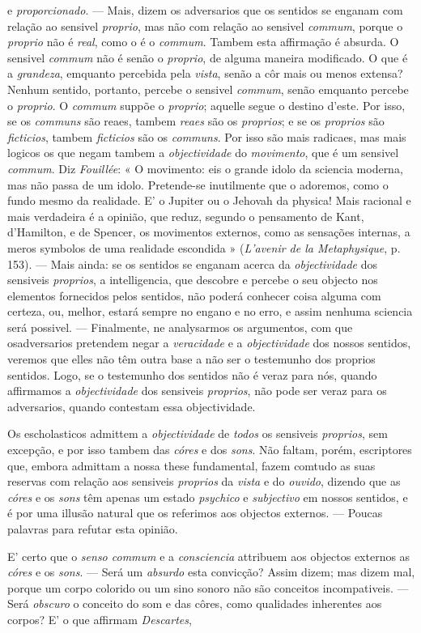 e \emph{proporcionado}. --- Mais, dizem os adversarios que os sentidos se enganam com relação ao sensivel \emph{proprio}, mas não com relação ao sensivel \emph{commum}, porque o \emph{proprio} não é \emph{real}, como o é o \emph{commum}. Tambem esta affirmação é absurda. O sensivel \emph{commum} não é senão o \emph{proprio}, de alguma maneira modificado. O que é a \emph{grandeza}, emquanto percebida pela \emph{vista}, senão a côr mais ou menos extensa? Nenhum sentido, portanto, percebe o sensivel \emph{commum}, senão emquanto percebe o \emph{proprio}. O \emph{commum} suppõe o \emph{proprio}; aquelle segue o destino d'este. Por isso, se os \emph{communs} são reaes, tambem \emph{reaes} são os \emph{proprios}; e se os \emph{proprios} são \emph{ficticios}, tambem \emph{ficticios} são os \emph{communs}. Por isso são mais radicaes, mas mais logicos os que negam tambem a \emph{objectividade} do \emph{movimento}, que é um sensivel \emph{commum}. Diz \emph{Fouillée}: « O movimento: eis o grande idolo da sciencia moderna, mas não passa de um idolo. Pretende-se inutilmente que o adoremos, como o fundo mesmo da realidade. E' o Jupiter ou o Jehovah da physica! Mais racional e mais verdadeira é a opinião, que reduz, segundo o pensamento de Kant, d'Hamilton, e de Spencer, os movimentos externos, como as sensações internas, a meros symbolos de uma realidade escondida » (\emph{L'avenir de la Metaphysique}, p. 153). --- Mais ainda: se os sentidos se enganam acerca da \emph{objectividade} dos sensiveis \emph{proprios}, a intelligencia, que descobre e percebe o seu objecto nos elementos fornecidos pelos sentidos, não poderá conhecer coisa alguma com certeza, ou, melhor, estará sempre no engano e no erro, e assim nenhuma sciencia será possivel. --- Finalmente, ne analysarmos os argumentos, com que osadversarios pretendem negar a \emph{veracidade} e a \emph{objectividade} dos nossos sentidos, veremos que elles não têm outra base a não ser o testemunho dos proprios sentidos. Logo, se o testemunho dos sentidos não é veraz para nós, quando affirmamos a \emph{objectividade} dos sensiveis \emph{proprios}, não pode ser veraz para os adversarios, quando contestam essa objectividade.\par Os escholasticos admittem a \emph{objectividade} de \emph{todos} os sensiveis \emph{proprios}, sem excepção, e por isso tambem das \emph{córes} e dos \emph{sons}. Não faltam, porém, escriptores que, embora admittam a nossa these fundamental, fazem comtudo as suas reservas com relação aos sensiveis \emph{proprios} da \emph{vista} e do \emph{ouvido}, dizendo que as \emph{córes} e os \emph{sons} têm apenas um estado \emph{psychico} e \emph{subjectivo} em nossos sentidos, e é por uma illusão natural que os referimos aos objectos externos. --- Poucas palavras para refutar esta opinião.\par E' certo que o \emph{senso commum} e a \emph{consciencia} attribuem aos objectos externos as \emph{córes} e os \emph{sons}. --- Será um \emph{absurdo} esta convicção? Assim dizem; mas dizem mal, porque um corpo colorido ou um sino sonoro não são conceitos incompativeis. --- Será \emph{obscuro} o conceito do som e das côres, como qualidades inherentes aos corpos? E' o que affirmam \emph{Descartes}, 